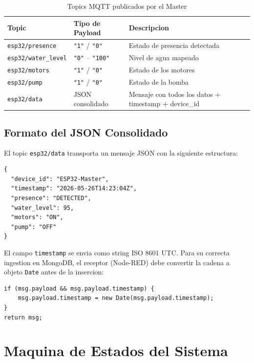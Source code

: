 \begin{table}[H]
\centering
\small
\caption{Topics MQTT publicados por el Master}
\label{tab:mqtt-topics}
\begin{tabularx}{\textwidth}{@{}lXX@{}}
\toprule
\textbf{Topic} & \textbf{Tipo de Payload} & \textbf{Descripcion} \\
\midrule
\texttt{esp32/presence} & \texttt{"1"} / \texttt{"0"} & Estado de presencia detectada \\
\texttt{esp32/water\_level} & \texttt{"0"} -- \texttt{"100"} & Nivel de agua mapeado \\
\texttt{esp32/motors} & \texttt{"1"} / \texttt{"0"} & Estado de los motores \\
\texttt{esp32/pump} & \texttt{"1"} / \texttt{"0"} & Estado de la bomba \\
\texttt{esp32/data} & JSON consolidado & Mensaje con todos los datos + timestamp + device\_id \\
\bottomrule
\end{tabularx}
\end{table}

\subsection{Formato del JSON Consolidado}

El topic \texttt{esp32/data} transporta un mensaje JSON con la siguiente estructura:

\begin{lstlisting}[caption={Formato del JSON consolidado en esp32/data},label={lst:json-consolidado}]
{
  "device_id": "ESP32-Master",
  "timestamp": "2026-05-26T14:23:04Z",
  "presence": "DETECTED",
  "water_level": 95,
  "motors": "ON",
  "pump": "OFF"
}
\end{lstlisting}

El campo \texttt{timestamp} se envia como string ISO 8601 UTC. Para su correcta ingestion en MongoDB, el receptor (Node-RED) debe convertir la cadena a objeto \texttt{Date} antes de la insercion:

\begin{lstlisting}[caption={Conversion de timestamp en Node-RED},label={lst:conversion-timestamp}]
if (msg.payload && msg.payload.timestamp) {
    msg.payload.timestamp = new Date(msg.payload.timestamp);
}
return msg;
\end{lstlisting}


\section{Maquina de Estados del Sistema}

